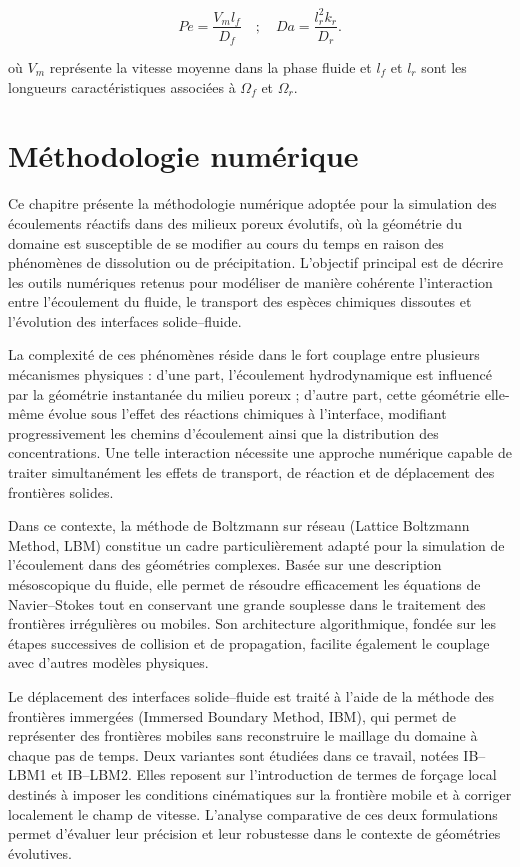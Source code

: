 \documentclass[12pt,a4paper]{report}
\begin{document}
\begin{equation}
Pe = \frac{V_m l_f}{D_f} \quad ; \quad Da = \frac{l_r^2 k_r}{D_r}.
\label{eq:60}
\end{equation}

où $V_m$ représente la vitesse moyenne dans la phase fluide et $l_f$ et $l_r$ sont les longueurs caractéristiques associées à $\Omega_f$ et $\Omega_r$.


\chapter{Méthodologie numérique}
Ce chapitre présente la méthodologie numérique adoptée pour la simulation des écoulements réactifs dans des milieux poreux évolutifs, où la géométrie du domaine est susceptible de se modifier au cours du temps en raison des phénomènes de dissolution ou de précipitation. L’objectif principal est de décrire les outils numériques retenus pour modéliser de manière cohérente l’interaction entre l’écoulement du fluide, le transport des espèces chimiques dissoutes et l’évolution des interfaces solide–fluide.

La complexité de ces phénomènes réside dans le fort couplage entre plusieurs mécanismes physiques : d’une part, l’écoulement hydrodynamique est influencé par la géométrie instantanée du milieu poreux ; d’autre part, cette géométrie elle-même évolue sous l’effet des réactions chimiques à l’interface, modifiant progressivement les chemins d’écoulement ainsi que la distribution des concentrations. Une telle interaction nécessite une approche numérique capable de traiter simultanément les effets de transport, de réaction et de déplacement des frontières solides.

Dans ce contexte, la méthode de Boltzmann sur réseau (Lattice Boltzmann Method, LBM) constitue un cadre particulièrement adapté pour la simulation de l’écoulement dans des géométries complexes. Basée sur une description mésoscopique du fluide, elle permet de résoudre efficacement les équations de Navier–Stokes tout en conservant une grande souplesse dans le traitement des frontières irrégulières ou mobiles. Son architecture algorithmique, fondée sur les étapes successives de collision et de propagation, facilite également le couplage avec d’autres modèles physiques.

Le déplacement des interfaces solide–fluide est traité à l’aide de la méthode des frontières immergées (Immersed Boundary Method, IBM), qui permet de représenter des frontières mobiles sans reconstruire le maillage du domaine à chaque pas de temps. Deux variantes sont étudiées dans ce travail, notées IB–LBM1 et IB–LBM2. Elles reposent sur l’introduction de termes de forçage local destinés à imposer les conditions cinématiques sur la frontière mobile et à corriger localement le champ de vitesse. L’analyse comparative de ces deux formulations permet d’évaluer leur précision et leur robustesse dans le contexte de géométries évolutives.
\end{document}
